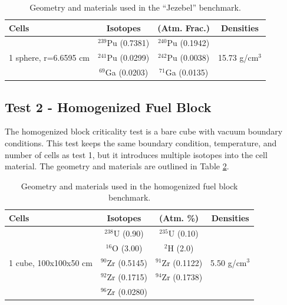 \documentclass[preprint,12pt]{elsarticle}
\begin{document}
\begin{table}[h]
\centering
\caption{Geometry and materials used in the ``Jezebel'' benchmark.}
\label{jezebel_geom}
\begin{tabular}{| l | c  c | c |}
\hline
Cells & Isotopes & (Atm. Frac.)& Densities \\
\hline
\multirow{3}{*}{1 sphere, r=6.6595 cm }  &  $^{239}$Pu (0.7381)    &    $^{240}$Pu (0.1942)     &  \multirow{3}{*}{15.73 g/cm$^3$} \\
                                         &  $^{241}$Pu (0.0299)    &     $^{242}$Pu (0.0038)    &   \\
                                         &  $^{69}$Ga  (0.0203)    &     $^{71}$Ga  (0.0135)    &   \\
\hline
\end{tabular}
\end{table}

\subsection{Test 2 - Homogenized Fuel Block}

The homogenized block criticality test is a bare cube with vacuum boundary conditions.  This test keeps the same boundary condition, temperature, and number of cells as test 1, but it introduces multiple isotopes into the cell material.   The geometry and materials are outlined in Table \ref{homfuel_geom}.  

\begin{table}[h]
\centering
\caption{Geometry and materials used in the homogenized fuel block benchmark.}
\label{homfuel_geom}
\begin{tabular}{| l | c  c | c |}
\hline
Cells & Isotopes & (Atm. \%)& Densities \\
\hline
\multirow{5}{*}{1 cube, 100x100x50 cm }            &   $^{238}$U   (0.90)   &  $^{235}$U   (0.10)   &  \multirow{5}{*}{5.50 g/cm$^3$} \\
                                                   &   $^{16}$O    (3.00)   &  $^{2}$H     (2.0)    &  \\
                                                   &   $^{90}$Zr   (0.5145) &  $^{91}$Zr   (0.1122) &  \\
                                                   &   $^{92}$Zr   (0.1715) &  $^{94}$Zr   (0.1738) &  \\
                                                   &   $^{96}$Zr   (0.0280) &                       &  \\
\hline
\end{tabular}
\end{table}
\end{document}

